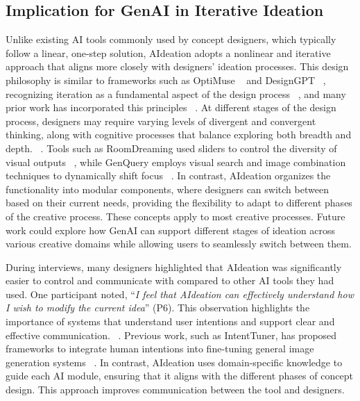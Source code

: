 
\subsection{Implication for GenAI in Iterative Ideation}
Unlike existing AI tools commonly used by concept designers, which typically follow a linear, one-step solution, AIdeation adopts a nonlinear and iterative approach that aligns more closely with designers' ideation processes. This design philosophy is similar to frameworks such as OptiMuse ~\cite{OptiMuse} and DesignGPT ~\cite{ding2023designgpt}, recognizing iteration as a fundamental aspect of the design process ~\cite{adams1999cognitive}, and many prior work has incorporated this principles ~\cite{hou2024c2ideas, han2024teams}.
At different stages of the design process, designers may require varying levels of divergent and convergent thinking, along with cognitive processes that balance exploring both breadth and depth. ~\cite{tversky2011creativity, goldschmidt2016linkographic}. Tools such as RoomDreaming used sliders to control the diversity of visual outputs ~\cite{wang2024roomdreaming}, while GenQuery employs visual search and image combination techniques to dynamically shift focus ~\cite{son2024genquery}. In contrast, AIdeation organizes the functionality into modular components, where designers can switch between based on their current needs, providing the flexibility to adapt to different phases of the creative process. 
These concepts apply to most creative processes. Future work could explore how GenAI can support different stages of ideation across various creative domains while allowing users to seamlessly switch between them.

During interviews, many designers highlighted that AIdeation was significantly easier to control and communicate with compared to other AI tools they had used. One participant noted, “\textit{I feel that AIdeation can effectively understand how I wish to modify the current idea}” (P6). This observation highlights the importance of systems that understand user intentions and support clear and effective communication. ~\cite{verganti2020innovation, shneiderman2022human}. Previous work, such as IntentTuner, has proposed frameworks to integrate human intentions into fine-tuning general image generation systems ~\cite{zeng2024intenttuner}. In contrast, AIdeation uses domain-specific knowledge to guide each AI module, ensuring that it aligns with the different phases of concept design. This approach improves communication between the tool and designers.

